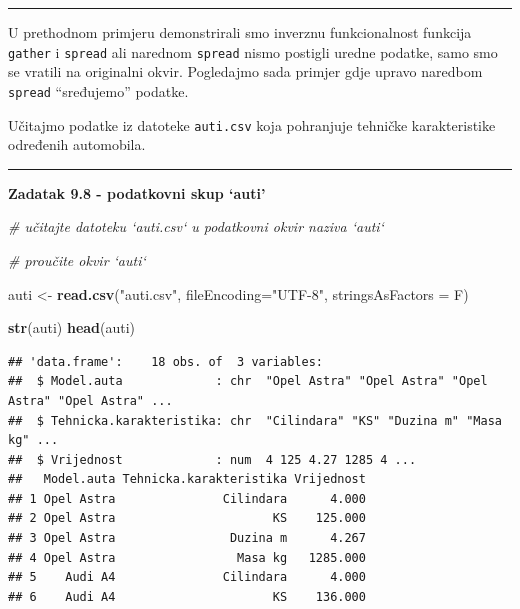 \documentclass[]{book}
\newenvironment{Shaded}{\begin{snugshade}}{\end{snugshade}}
\newcommand{\KeywordTok}[1]{\textcolor[rgb]{0.13,0.29,0.53}{\textbf{#1}}}
\newcommand{\DataTypeTok}[1]{\textcolor[rgb]{0.13,0.29,0.53}{#1}}
\newcommand{\StringTok}[1]{\textcolor[rgb]{0.31,0.60,0.02}{#1}}
\newcommand{\CommentTok}[1]{\textcolor[rgb]{0.56,0.35,0.01}{\textit{#1}}}
\newcommand{\NormalTok}[1]{#1}
\theoremstyle{definition}
\theoremstyle{definition}
\theoremstyle{definition}
\theoremstyle{remark}
\begin{document}
\begin{center}\rule{0.5\linewidth}{\linethickness}\end{center}

U prethodnom primjeru demonstrirali smo inverznu funkcionalnost funkcija
\texttt{gather} i \texttt{spread} ali narednom \texttt{spread} nismo
postigli uredne podatke, samo smo se vratili na originalni okvir.
Pogledajmo sada primjer gdje upravo naredbom \texttt{spread}
``sređujemo'' podatke.

Učitajmo podatke iz datoteke \texttt{auti.csv} koja pohranjuje tehničke
karakteristike određenih automobila.

\begin{center}\rule{0.5\linewidth}{\linethickness}\end{center}

\textbf{Zadatak 9.8 - podatkovni skup `auti'}

\begin{Shaded}
\begin{Highlighting}[]
\CommentTok{# učitajte datoteku `auti.csv` u podatkovni okvir naziva `auti`}

\CommentTok{# proučite okvir `auti`}
\end{Highlighting}
\end{Shaded}

\begin{Shaded}
\begin{Highlighting}[]
\NormalTok{auti <-}\StringTok{ }\KeywordTok{read.csv}\NormalTok{(}\StringTok{"auti.csv"}\NormalTok{, }\DataTypeTok{fileEncoding=}\StringTok{"UTF-8"}\NormalTok{, }\DataTypeTok{stringsAsFactors =}\NormalTok{ F)}

\KeywordTok{str}\NormalTok{(auti)}
\KeywordTok{head}\NormalTok{(auti)}
\end{Highlighting}
\end{Shaded}

\begin{verbatim}
## 'data.frame':    18 obs. of  3 variables:
##  $ Model.auta             : chr  "Opel Astra" "Opel Astra" "Opel Astra" "Opel Astra" ...
##  $ Tehnicka.karakteristika: chr  "Cilindara" "KS" "Duzina m" "Masa kg" ...
##  $ Vrijednost             : num  4 125 4.27 1285 4 ...
##   Model.auta Tehnicka.karakteristika Vrijednost
## 1 Opel Astra               Cilindara      4.000
## 2 Opel Astra                      KS    125.000
## 3 Opel Astra                Duzina m      4.267
## 4 Opel Astra                 Masa kg   1285.000
## 5    Audi A4               Cilindara      4.000
## 6    Audi A4                      KS    136.000
\end{verbatim}
\end{document}
